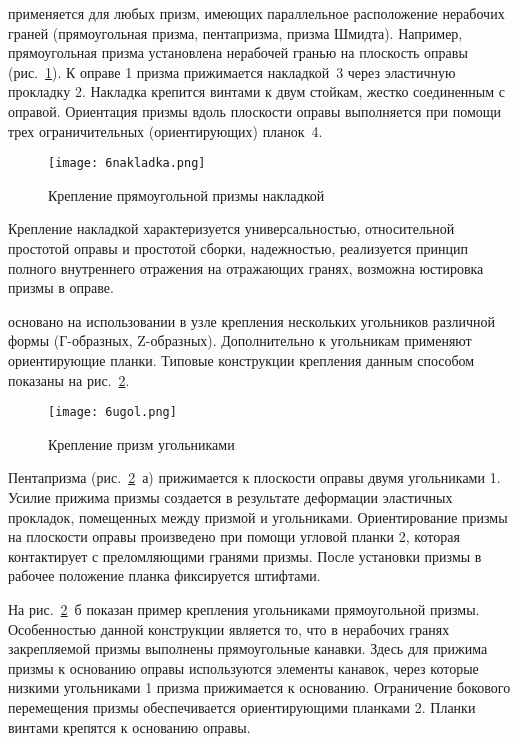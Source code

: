   применяется для любых призм, имеющих параллельное расположение нерабочих граней (прямоугольная призма, пентапризма, призма Шмидта). 
Например, прямоугольная призма установлена нерабочей гранью на плоскость оправы (рис.~\ref{pic:6nakladka}). 
К оправе 1 призма прижимается накладкой~3 через эластичную прокладку 2. 
Накладка крепится винтами к двум стойкам, жестко соединенным с оправой. Ориентация призмы вдоль плоскости оправы выполняется при помощи трех ограничительных (ориентирующих) планок~4.

\begin{figure}[h!]	
	\texttt{[image: 6nakladka.png]}
	\caption{ Крепление прямоугольной призмы накладкой }
	\label{pic:6nakladka}
\end{figure}

Крепление накладкой характеризуется универсальностью, относительной простотой оправы и простотой сборки, надежностью, реализуется принцип полного внутреннего отражения на отражающих гранях, возможна юстировка призмы в оправе.

  основано на использовании в узле крепления нескольких угольников различной формы (Г-образных, Z-образных). 
Дополнительно к угольникам применяют ориентирующие планки. 
Типовые конструкции крепления данным способом показаны на рис.~\ref{pic:6ugol}.

\begin{figure}[h!]
	\begin{center}
		\caption{ Крепление призм угольниками }
		\texttt{[image: 6ugol.png]}
		\label{pic:6ugol}
	\end{center}
\end{figure}

Пентапризма (рис.~\ref{pic:6ugol}~а) прижимается к плоскости оправы двумя угольниками 1. Усилие прижима призмы создается в результате деформации эластичных прокладок, помещенных между призмой и угольниками. Ориентирование призмы на плоскости оправы произведено при помощи угловой планки 2, которая контактирует с преломляющими гранями призмы. После установки призмы в рабочее положение планка фиксируется штифтами.

На рис.~\ref{pic:6ugol}~б показан пример крепления угольниками прямоугольной призмы. Особенностью данной конструкции является то, что в нерабочих гранях закрепляемой призмы выполнены прямоугольные канавки. Здесь для прижима призмы к основанию оправы используются элементы канавок, через которые низкими угольниками 1 призма прижимается к основанию. Ограничение бокового перемещения призмы обеспечивается ориентирующими планками 2. Планки винтами крепятся к основанию оправы.

